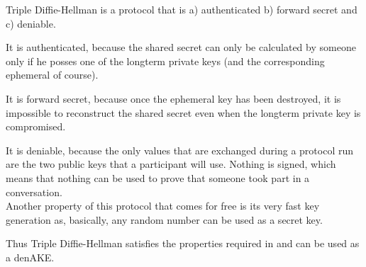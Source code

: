 \documentclass[12pt,titlepage,a4paper]{article}
\begin{document}
{Triple Diffie-Hellman is a protocol that is a) authenticated b) forward secret
and c) deniable.

It is authenticated, because the shared secret can only be calculated by someone
only if he posses one of the longterm private keys (and the corresponding ephemeral
of course).

It is forward secret, because once the ephemeral key has been destroyed, it is
impossible to reconstruct the shared secret even when the longterm
private key is compromised.

It is deniable, because the only values that are exchanged during a protocol run
are the two public keys that a participant will use. Nothing is signed, which means
that nothing can be used to prove that someone took part in a conversation.\\[0.5cm]

Another property of this protocol that comes for free is its very fast key generation
as, basically, any random number can be used as a secret key.

Thus Triple Diffie-Hellman satisfies the properties required in \cite{mpotr} and
can be used as a denAKE.

}
\end{document}
